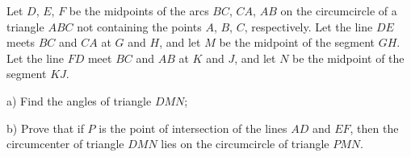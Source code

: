 Let $D$, $E$, $F$ be the midpoints of the arcs $BC$, $CA$, $AB$ on the circumcircle of a triangle $ABC$ not containing the points $A$, $B$, $C$, respectively. Let the line $DE$ meets $BC$ and $CA$ at $G$ and $H$, and let $M$ be the midpoint of the segment $GH$. Let the line $FD$ meet $BC$ and $AB$ at $K$ and $J$, and let $N$ be the midpoint of the segment $KJ$.

a) Find the angles of triangle $DMN$;

b) Prove that if $P$ is the point of intersection of the lines $AD$ and $EF$, then the circumcenter of triangle $DMN$ lies on the circumcircle of triangle $PMN$.